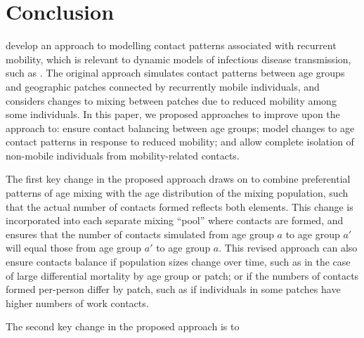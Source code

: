 \section{Conclusion}\label{conc}
\citet{Arenas2020} develop an approach to modelling
contact patterns associated with recurrent mobility,
which is relevant to dynamic models of infectious disease transmission, such as \sarscovii.
The original approach simulates contact patterns between
age groups and geographic patches connected by recurrently mobile individuals,
and considers changes to mixing between patches due to reduced mobility among some individuals.
In this paper, we proposed approaches to improve upon the approach to:
ensure contact balancing between age groups;
model changes to age contact patterns in response to reduced mobility; and
allow complete isolation of non-mobile individuals from mobility-related contacts.
\par
The first key change in the proposed approach draws on \cite{Arregui2018} to
combine preferential patterns of age mixing with the age distribution of the mixing population,
such that the actual number of contacts formed reflects both elements.
This change is incorporated into each separate mixing ``pool'' where contacts are formed,
and ensures that the number of contacts simulated from age group $a$ to age group $a'$
will equal those from age group $a'$ to age group $a$.
This revised approach can also ensure contacts balance
if population sizes change over time,
such as in the case of large differential mortality by age group or patch;
or if the numbers of contacts formed per-person differ by patch,
such as if individuals in some patches have higher numbers of work contacts.
\par
The second key change in the proposed approach is to
